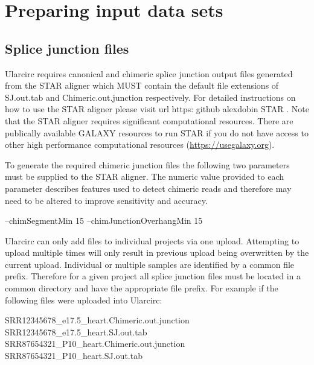 \documentclass[12pt]{article}
\begin{document}
\section{Preparing input data sets} \label{sec:prepare}

\subsection{Splice junction files} \label{sec:FSJfiles}
\indent Ularcirc requires canonical and chimeric splice junction output files generated from the STAR aligner which  MUST contain the default file extensions of SJ.out.tab and Chimeric.out.junction respectively. For detailed instructions on how to use the STAR aligner please visit url https: github alexdobin STAR . Note that the STAR aligner requires significant computational resources. There are publically available GALAXY resources to run STAR if you do not have access to other high performance computational resources (\url {https://usegalaxy.org}). \par
To generate the required chimeric junction files the following two parameters must be supplied to the STAR aligner. The numeric value provided to each parameter describes features used to detect chimeric reads and therefore may need to be altered to improve sensitivity and accuracy.

\begin{mdframed}--chimSegmentMin 15  --chimJunctionOverhangMin 15 \end{mdframed}

Ularcirc can only add files to individual projects via one upload. Attempting to upload multiple times will only result in previous upload being overwritten by the current upload. Individual or multiple samples are identified by a common file prefix. Therefore for a given project all splice junction files must be located in a common directory and have the appropriate file prefix. For example if the following files were uploaded into Ularcirc:

\begin{mdframed}
SRR12345678\_e17.5\_heart.Chimeric.out.junction \\
SRR12345678\_e17.5\_heart.SJ.out.tab \\
SRR87654321\_P10\_heart.Chimeric.out.junction \\
SRR87654321\_P10\_heart.SJ.out.tab
\end{mdframed}
\end{document}
